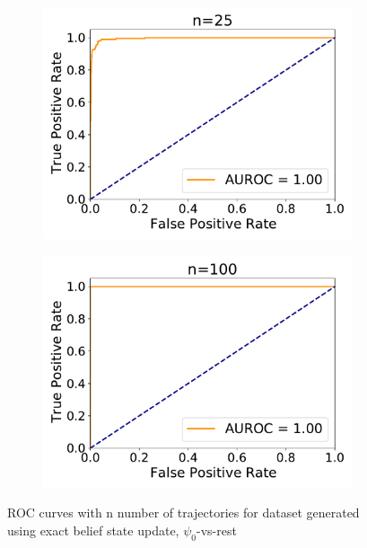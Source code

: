\begin{figure}[H]
\begin{subfigure}{.33\textwidth}
		\centering
		\includegraphics[width=1\linewidth]{figures/roc_analysis/roc_exactUpdate/AUROC_2000samples_class0_llh_n25}
		\caption{}
		\label{fig:roc_exact_n25}
	\end{subfigure}
	\begin{subfigure}{.33\textwidth}
		\centering
		\includegraphics[width=1\linewidth]{figures/roc_analysis/roc_exactUpdate/AUROC_2000samples_class0_llh_n100}
		\caption{}
		\label{fig:roc_exact_n100}
	\end{subfigure}
	\caption{ROC curves with n number of trajectories for dataset generated using exact belief state update, $ \psi_0 $-vs-rest}
	\label{fig:roc_exact}
\end{figure}


